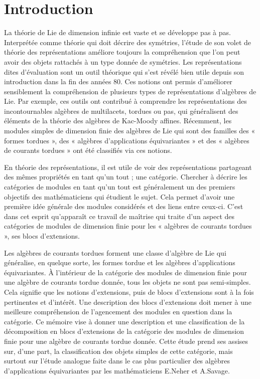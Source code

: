 \chapter*{Introduction}         %

La théorie de Lie de dimension infinie est vaste et se développe pas à pas. Interprétée comme théorie qui doit décrire des symétries, l'étude de son volet de théorie des représentations améliore toujours la compréhension que l'on peut avoir des objets rattachés à un type donnée de symétries. Les représentations dites d'évaluation sont un outil théorique qui s'est révélé bien utile depuis son introduction dans la fin des années 80. Ces notions ont permis d'améliorer sensiblement la compréhension de plusieurs types de représentations d'algèbres de Lie. Par exemple, ces outils ont contribué à comprendre les représentations des incontournables algèbres de multilacets, tordues ou pas, qui généralisent des éléments de la théorie des algèbres de Kac-Moody affines. Récemment, les modules simples de dimension finie des algèbres de Lie qui sont des familles des « formes tordues », des « algèbres d'applications équivariantes » et des « algèbres de courants tordues » ont été classifiés via ces notions.

En théorie des représentations, il est utile de voir des représentations partageant des mêmes propriétés en tant qu'un tout ; une catégorie. Chercher à décrire les catégories de modules en tant qu'un tout est généralement un des premiers objectifs des mathématiciens qui étudient le sujet. Cela permet d'avoir une première idée générale des modules considérés et des liens entre ceux-ci. C'est dans cet esprit qu'apparaît ce travail de maîtrise qui traite d'un aspect des catégories de modules de dimension finie pour les « algèbres de courants tordues », ses blocs d'extensions.

Les algèbres de courants tordues forment une classe d'algèbre de Lie qui généralise, en quelque sorte, les formes tordue et les algèbres d'applications équivariantes. À l'intérieur de la catégorie des modules de dimension finie pour une algèbre de courants tordue donnée, tous les objets ne sont pas semi-simples. Cela signifie que les notions d'extensions, puis de blocs d'extensions sont à la fois pertinentes et d'intérêt. Une description des blocs d'extensions doit mener à une meilleure compréhension de l'agencement des modules en question dans la catégorie. Ce mémoire vise à donner une description et une classification de la décomposition en blocs d'extensions de la catégorie des modules de dimension finie pour une algèbre de courants tordue donnée. Cette étude prend ses assises sur, d'une part, la classification des objets simples de cette catégorie, mais surtout sur l'étude analogue faite dans le cas plus particulier des algèbres d'applications équivariantes par les mathématiciens E.Neher et A.Savage.

